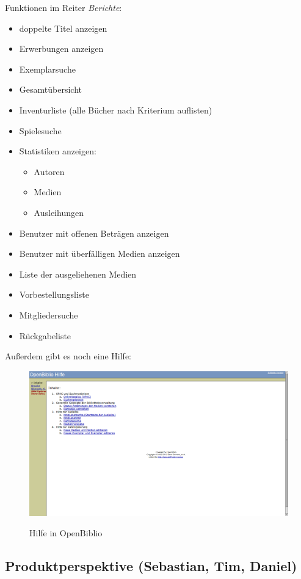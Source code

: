 \documentclass[fontsize=12pt,paper=a4,twoside]{scrartcl}
\begin{document}
Funktionen im Reiter \emph{Berichte}:\\
\begin{itemize}
	\item doppelte Titel anzeigen
	\item Erwerbungen anzeigen
	\item Exemplarsuche
	\item Gesamtübersicht
	\item Inventurliste (alle Bücher nach Kriterium auflisten)
	\item Spielesuche
	\item Statistiken anzeigen:
	\begin{itemize}
		\item  Autoren
		\item Medien
		\item Ausleihungen
	\end{itemize}
	\item Benutzer mit offenen Beträgen anzeigen
	\item Benutzer mit überfälligen Medien anzeigen
	\item Liste der ausgeliehenen Medien
	\item Vorbestellungsliste
	\item Mitgliedersuche
	\item Rückgabeliste
\end{itemize}
Außerdem gibt es noch eine Hilfe:\\
\begin{figure}[h]
\caption{Hilfe in OpenBiblio}
\includegraphics[width=1\textwidth]{OpenBiblio/hilfe.png}
  \label{hilfe-openbiblio}
\end{figure}

\subsection{Produktperspektive (Sebastian, Tim, Daniel)}
  
\end{document}
